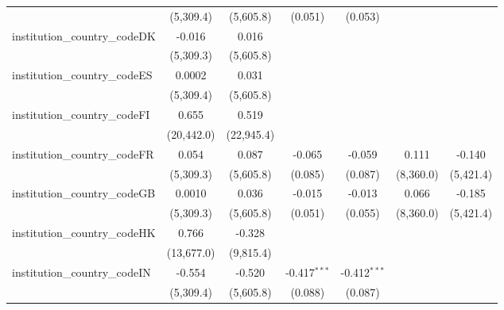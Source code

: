\begin{tabular}{lcccccc}
                                         & (5,309.4)     & (5,605.8)     & (0.051)        & (0.053)        &                &   \\   
   institution\_country\_codeDK          & -0.016        & 0.016         &                &                &                &   \\   
                                         & (5,309.3)     & (5,605.8)     &                &                &                &   \\   
   institution\_country\_codeES          & 0.0002        & 0.031         &                &                &                &   \\   
                                         & (5,309.4)     & (5,605.8)     &                &                &                &   \\   
   institution\_country\_codeFI          & 0.655         & 0.519         &                &                &                &   \\   
                                         & (20,442.0)    & (22,945.4)    &                &                &                &   \\   
   institution\_country\_codeFR          & 0.054         & 0.087         & -0.065         & -0.059         & 0.111          & -0.140\\   
                                         & (5,309.3)     & (5,605.8)     & (0.085)        & (0.087)        & (8,360.0)      & (5,421.4)\\   
   institution\_country\_codeGB          & 0.0010        & 0.036         & -0.015         & -0.013         & 0.066          & -0.185\\   
                                         & (5,309.3)     & (5,605.8)     & (0.051)        & (0.055)        & (8,360.0)      & (5,421.4)\\   
   institution\_country\_codeHK          & 0.766         & -0.328        &                &                &                &   \\   
                                         & (13,677.0)    & (9,815.4)     &                &                &                &   \\   
   institution\_country\_codeIN          & -0.554        & -0.520        & -0.417$^{***}$ & -0.412$^{***}$ &                &   \\   
                                         & (5,309.4)     & (5,605.8)     & (0.088)        & (0.087)        &                &   \\   

\end{tabular}
